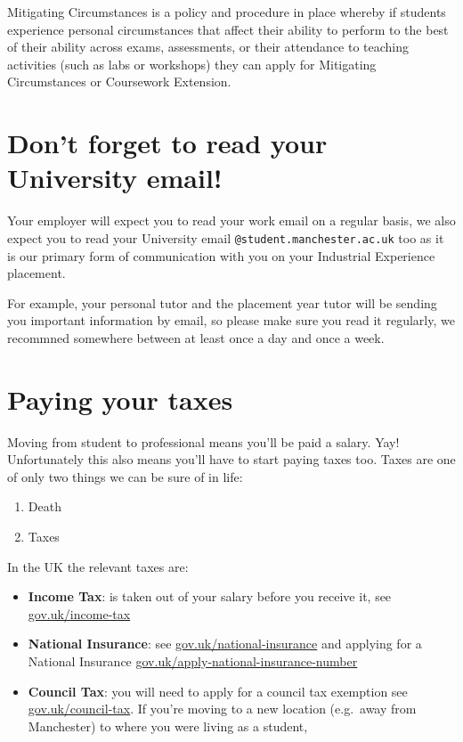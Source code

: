 \documentclass[
]{book}
\providecommand{\tightlist}{%
  \setlength{\itemsep}{0pt}\setlength{\parskip}{0pt}}
\begin{document}
Mitigating Circumstances is a policy and procedure in place whereby if students experience personal circumstances that affect their ability to perform to the best of their ability across exams, assessments, or their attendance to teaching activities (such as labs or workshops) they can apply for Mitigating Circumstances or Coursework Extension. \citep{mitcircs}

\section{Don't forget to read your University email!}\label{email}

Your employer will expect you to read your work email on a regular basis, we also expect you to read your University email \texttt{@student.manchester.ac.uk} too as it is our primary form of communication with you on your Industrial Experience placement.

For example, your personal tutor and the placement year tutor will be sending you important information by email, so please make sure you read it regularly, we recommned somewhere between at least once a day and once a week.

\section{Paying your taxes}\label{taxes}

Moving from student to professional means you'll be paid a salary. Yay! Unfortunately this also means you'll have to start paying taxes too. Taxes are one of only two things we can be sure of in life:

\begin{enumerate}
\def\labelenumi{\arabic{enumi}.}
\tightlist
\item
  Death \citep{death}
\item
  Taxes \citep{death}
\end{enumerate}

In the UK the relevant taxes are:

\begin{itemize}
\tightlist
\item
  \textbf{Income Tax}: is taken out of your salary before you receive it, see \href{https://www.gov.uk/income-tax}{gov.uk/income-tax} \citep{income-tax}
\item
  \textbf{National Insurance}: see \href{https://www.gov.uk/national-insurance}{gov.uk/national-insurance} \citep{national} and applying for a National Insurance \href{https://www.gov.uk/apply-national-insurance-number}{gov.uk/apply-national-insurance-number} \citep{apply}
\item
  \textbf{Council Tax}: you will need to apply for a council tax exemption see \href{https://www.gov.uk/council-tax}{gov.uk/council-tax}\citep{council-tax}. If you're moving to a new location (e.g.~away from Manchester) to where you were living as a student, \citep{exemption1, exemption2}
\end{itemize}
\end{document}

